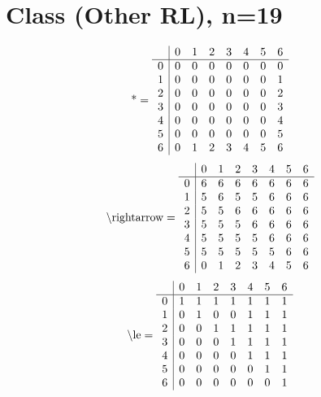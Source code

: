 \documentclass[11pt]{article}
\begin{document}
\section{Class (Other RL), n=19}
\[\text{*} = 
\begin{array}{r | r r r r r r r}
 & 0 & 1 & 2 & 3 & 4 & 5 & 6 \\ \hline
0 & 0 & 0 & 0 & 0 & 0 & 0 & 0 \\
1 & 0 & 0 & 0 & 0 & 0 & 0 & 1 \\
2 & 0 & 0 & 0 & 0 & 0 & 0 & 2 \\
3 & 0 & 0 & 0 & 0 & 0 & 0 & 3 \\
4 & 0 & 0 & 0 & 0 & 0 & 0 & 4 \\
5 & 0 & 0 & 0 & 0 & 0 & 0 & 5 \\
6 & 0 & 1 & 2 & 3 & 4 & 5 & 6 \\
\end{array}
\]
\[\text{\textbackslash rightarrow} = 
\begin{array}{r | r r r r r r r}
 & 0 & 1 & 2 & 3 & 4 & 5 & 6 \\ \hline
0 & 6 & 6 & 6 & 6 & 6 & 6 & 6 \\
1 & 5 & 6 & 5 & 5 & 6 & 6 & 6 \\
2 & 5 & 5 & 6 & 6 & 6 & 6 & 6 \\
3 & 5 & 5 & 5 & 6 & 6 & 6 & 6 \\
4 & 5 & 5 & 5 & 5 & 6 & 6 & 6 \\
5 & 5 & 5 & 5 & 5 & 5 & 6 & 6 \\
6 & 0 & 1 & 2 & 3 & 4 & 5 & 6 \\
\end{array}
\]
\[\text{\textbackslash le} = 
\begin{array}{r | r r r r r r r}
 & 0 & 1 & 2 & 3 & 4 & 5 & 6 \\ \hline
0 & 1 & 1 & 1 & 1 & 1 & 1 & 1 \\
1 & 0 & 1 & 0 & 0 & 1 & 1 & 1 \\
2 & 0 & 0 & 1 & 1 & 1 & 1 & 1 \\
3 & 0 & 0 & 0 & 1 & 1 & 1 & 1 \\
4 & 0 & 0 & 0 & 0 & 1 & 1 & 1 \\
5 & 0 & 0 & 0 & 0 & 0 & 1 & 1 \\
6 & 0 & 0 & 0 & 0 & 0 & 0 & 1 \\
\end{array}
\]
\end{document}
